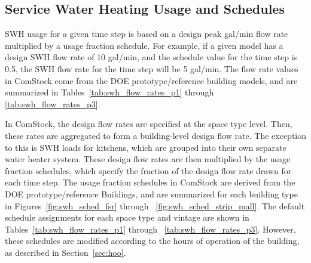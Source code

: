 %

\subsection{Service Water Heating Usage and Schedules}

SWH usage for a given time step is based on a design peak gal/min flow rate multiplied by a usage fraction schedule. For example, if a given model has a design SWH flow rate of 10 gal/min, and the schedule value for the time step is 0.5, the SWH flow rate for the time step will be 5 gal/min. The flow rate values in ComStock come from the DOE prototype/reference building models, and are summarized in Tables~\ref{tab:swh_flow_rates_p1} through \ref{tab:swh_flow_rates_p3}.

In ComStock, the design flow rates are specified at the space type level. Then, these rates are aggregated to form a building-level design flow rate. The exception to this is SWH loads for kitchens, which are grouped into their own separate water heater system. These design flow rates are then multiplied by the usage fraction schedules, which specify the fraction of the design flow rate drawn for each time step. The usage fraction schedules in ComStock are derived from the DOE prototype/reference Buildings, and are summarized for each building type in Figures~\ref{fig:swh_sched_fsr} through ~\ref{fig:swh_sched_strip_mall}. The default schedule assignments for each space type and vintage are shown in Tables~\ref{tab:swh_flow_rates_p1} through ~\ref{tab:swh_flow_rates_p3}. However, these schedules are modified according to the hours of operation of the building, as described in Section~\ref{sec:hoo}. 


%
%
%





